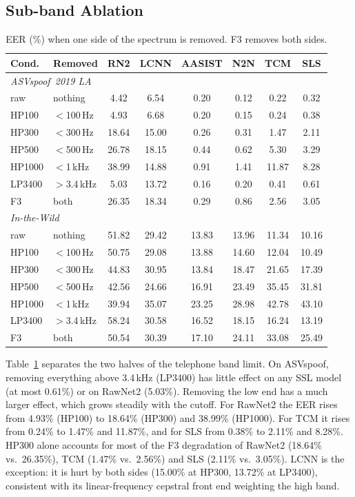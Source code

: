 \documentclass[conference]{IEEEtran}
\begin{document}
\subsection{Sub-band Ablation}

\begin{table}[t]
\centering
\caption{EER (\%) when one side of the spectrum is removed. F3 removes both sides.}
\label{tab:subband}
\setlength{\tabcolsep}{2.8pt}
\begin{tabular}{llcccccc}
\toprule
Cond. & Removed & RN2 & LCNN & AASIST & N2N & TCM & SLS \\
\midrule
\multicolumn{8}{l}{\textit{ASVspoof~2019 LA}} \\
raw    & nothing     & 4.42 & 6.54 & 0.20 & 0.12 & 0.22 & 0.32 \\
HP100  & $<$100\,Hz  & 4.93 & 6.68 & 0.20 & 0.15 & 0.24 & 0.38 \\
HP300  & $<$300\,Hz  & 18.64 & 15.00 & 0.26 & 0.31 & 1.47 & 2.11 \\
HP500  & $<$500\,Hz  & 26.78 & 18.15 & 0.44 & 0.62 & 5.30 & 3.29 \\
HP1000 & $<$1\,kHz   & 38.99 & 14.88 & 0.91 & 1.41 & 11.87 & 8.28 \\
LP3400 & $>$3.4\,kHz & 5.03 & 13.72 & 0.16 & 0.20 & 0.41 & 0.61 \\
F3     & both        & 26.35 & 18.34 & 0.29 & 0.86 & 2.56 & 3.05 \\
\midrule
\multicolumn{8}{l}{\textit{In-the-Wild}} \\
raw    & nothing     & 51.82 & 29.42 & 13.83 & 13.96 & 11.34 & 10.16 \\
HP100  & $<$100\,Hz  & 50.75 & 29.08 & 13.88 & 14.60 & 12.04 & 10.49 \\
HP300  & $<$300\,Hz  & 44.83 & 30.95 & 13.84 & 18.47 & 21.65 & 17.39 \\
HP500  & $<$500\,Hz  & 42.56 & 24.66 & 16.91 & 23.49 & 35.45 & 31.81 \\
HP1000 & $<$1\,kHz   & 39.94 & 35.07 & 23.25 & 28.98 & 42.78 & 43.10 \\
LP3400 & $>$3.4\,kHz & 58.24 & 30.58 & 16.52 & 18.15 & 16.24 & 13.19 \\
F3     & both        & 50.54 & 30.39 & 17.10 & 24.11 & 33.08 & 25.49 \\
\bottomrule
\end{tabular}
\end{table}

Table~\ref{tab:subband} separates the two halves of the telephone band
limit. On ASVspoof, removing everything above 3.4\,kHz (LP3400) has little
effect on any SSL model (at most 0.61\%) or on RawNet2 (5.03\%). Removing
the low end has a much larger effect, which grows steadily with the cutoff.
For RawNet2 the EER rises from 4.93\% (HP100) to 18.64\% (HP300) and 38.99\%
(HP1000). For TCM it rises from 0.24\% to 1.47\% and 11.87\%, and for SLS
from 0.38\% to 2.11\% and 8.28\%. HP300 alone accounts for most of the F3
degradation of RawNet2 (18.64\% vs.\ 26.35\%), TCM (1.47\% vs.\ 2.56\%) and
SLS (2.11\% vs.\ 3.05\%). LCNN is the exception: it is hurt by both sides
(15.00\% at HP300, 13.72\% at LP3400), consistent with its linear-frequency
cepstral front end weighting the high band.
\end{document}
